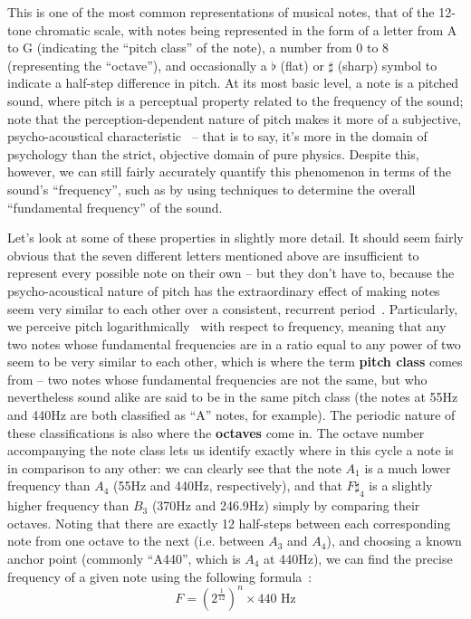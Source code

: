 \documentclass[12pt]{report}
\begin{document}
\indent This is one of the most common representations of musical notes, that of the 12-tone chromatic scale, with notes being represented in the form of a letter from A to G (indicating the ``pitch class'' of the note), a number from 0 to 8 (representing the ``octave''), and occasionally a $\flat$ (flat) or $\sharp$ (sharp) symbol to indicate a half-step difference in pitch. At its most basic level, a note is a pitched sound, where pitch is a perceptual property related to the frequency of the sound; note that the perception-dependent nature of pitch makes it more of a subjective, psycho-acoustical characteristic~\cite[p.145]{Hartmann1997} -- that is to say, it's more in the domain of psychology than the strict, objective domain of pure physics. Despite this, however, we can still fairly accurately quantify this phenomenon in terms of the sound's ``frequency'', such as by using techniques to determine the overall ``fundamental frequency'' of the sound.

\indent Let's look at some of these properties in slightly more detail. It should seem fairly obvious that the seven different letters mentioned above are insufficient to represent every possible note on their own -- but they don't have to, because the psycho-acoustical nature of pitch has the extraordinary effect of making notes seem very similar to each other over a consistent, recurrent period~\cite[p.776]{Randel2003}. Particularly, we perceive pitch logarithmically~\cite{Hass2003} with respect to frequency, meaning that any two notes whose fundamental frequencies are in a ratio equal to any power of two seem to be very similar to each other, which is where the term {\bf pitch class} comes from -- two notes whose fundamental frequencies are not the same, but who nevertheless sound alike are said to be in the same pitch class (the notes at 55Hz and 440Hz are both classified as ``A'' notes, for example). The periodic nature of these classifications is also where the {\bf octaves} come in. The octave number accompanying the note class lets us identify exactly where in this cycle a note is in comparison to any other: we can clearly see that the note $A_1$ is a much lower frequency than $A_4$ (55Hz and 440Hz, respectively), and that $F\sharp_4$ is a slightly higher frequency than $B_3$ (370Hz and 246.9Hz) simply by comparing their octaves. Noting that there are exactly 12 half-steps between each corresponding note from one octave to the next (i.e. between $A_3$ and $A_4$), and choosing a known anchor point (commonly ``A440'', which is $A_4$ at 440Hz), we can find the precise frequency of a given note using the following formula~\cite{Qehn-nd}: 
$$ F = (2^\frac{1}{12})^n \times 440 \mbox{ Hz} $$
\end{document}
